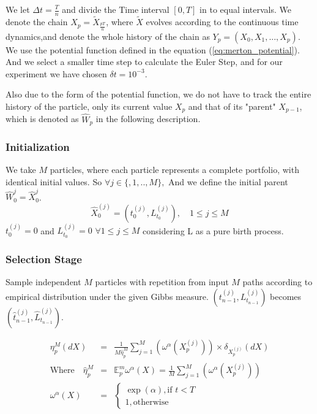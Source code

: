 We let $\Delta t = \frac{T}{n}$ and divide the Time interval $[0,T]$ in to equal 
intervals. We denote the chain $X_p = \tilde{X}_{\frac{pT}{n}}$, where $\tilde{X}$ 
evolves according to the continuous time dynamics,and denote the whole history of 
the chain as $Y_{p} =(X_{0},X_{1},...,X_{p})$. We use the potential function 
defined in the equation (\ref{eq:merton_potential}). And we select a smaller 
time step to calculate the Euler Step, and for our experiment we have chosen 
$\delta t = 10^{-3}$.

Also due to the form of the potential function, we do not have to track the 
entire history of the particle, only its current value $X_p$ and that of its 
"parent" $X_{p-1}$, which is denoted as $\hat{W}_p$ in the following description.

\subsubsection{Initialization}
We take $M$ particles, where each particle represents a complete portfolio, 
with identical initial values. So $\forall j \in \{,1,..,M\},$
And we define the initial parent $\hat{W}_0^{j}=\hat{X}_0^{j}$.
\begin{equation*}
\hat{X}_0^{(j)} = \left( t_{0}^{(j)},L_{t_0}^{(j)} \right),  \quad  1 \leq j\leq M                                                                    
\end{equation*}
$ t_{0}^{(j)} = 0$ and $ L_{t_{0}}^{(j)} = 0$ $\forall 1 \leq j\leq M $ considering L as a pure birth process.


\subsubsection{Selection Stage}
Sample independent $M$ particles with repetition from input $M$ paths according to empirical distribution under the given Gibbs measure.
$\left(t^{(j)}_{n-1}, L_{t_{n-1}}^{(j)} \right)$ becomes $\left( \hat{t}_{n-1}^{(j)}, \hat{L}_{t_{n-1}}^{(j)}\right)$.

\begin{eqnarray*}
\eta_{p}^{M}(dX) & = & \frac{1}{M \hat{\eta}_{p}^{M}}\sum_{j=1}^{M}\left(\omega^{\alpha}(X_{p}^{(j)})\right) \times \delta_{{X}_p^{(j)}}(dX) \\
\text{Where} \quad
\hat{\eta}_{p}^{M} & = & \mathbb{E}_{p}^{m}\omega^{\alpha}(X) =
\frac{1}{M}\sum_{j=1}^{M}\left(\omega^{\alpha}(X_{p}^{(j)})\right)\\
\omega^{\alpha}(X) & = &  
\begin{cases}
\exp(\alpha), \text{if } t < T\\
1,               \text{otherwise}
\end{cases}
\end{eqnarray*}

